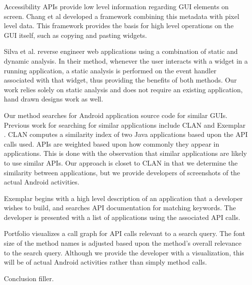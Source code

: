\documentclass[10pt,twocolumn]{article}
\begin{document}
Accessibility APIs provide low level information regarding GUI elements on
screen.  Chang et al \cite{accessibility} developed a framework combining this
metadata with pixel level data.  This framework provides the basis for high
level operations on the GUI itself, such as copying and pasting widgets.

Silva et al. \cite{staticAndDynamic} reverse engineer web applications using a
combination of static and dynamic analysis.  In their method, whenever the user
interacts with a widget in a running application, a static analysis is performed
on the event handler associated with that widget, thus providing the benefits of
both methods. Our work relies solely on static analysis and does not require an
existing application, hand drawn designs work as well.

Our method searches for Android application source code for similar GUIs.
Previous work for searching for similar applications include CLAN \cite{clan}
and Exemplar \cite{exemplar}. CLAN \cite{clan} computes a similarity index of
two Java applications based upon the API calls used.  APIs are weighted based
upon how commonly they appear in applications.  This is done with the
observation that similar applications are likely to use similar APIs.  Our
approach is closet to CLAN in that we determine the similarity between
applications, but we provide developers of screenshots of the actual Android
activities.

Exemplar \cite{exemplar} begins with a high level description of an application
that a developer wishes to build, and searches API documentation for matching
keywords.  The developer is presented with a list of applications using the
associated API calls.

Portfolio \cite{portfolio, portfolioMillions} visualizes a call graph for API
calls relevant to a search query.  The font size of the method names is adjusted
based upon the method's overall relevance to the search query.  Although we
provide the developer with a visualization, this will be of actual Android
activities rather than simply method calls.


Conclusion filler.

\nocite{*}


\end{document}
